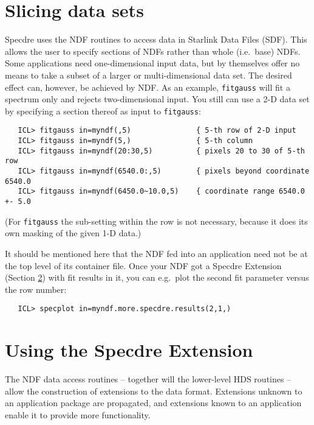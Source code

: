 \goodbreak
\section{Slicing data sets}
\label{slice}

Specdre uses the NDF routines to access data in Starlink Data Files (SDF).
This allows the user to specify sections of NDFs rather than whole (i.e.\ base)
NDFs. Some applications need one-dimensional input data, but by themselves
offer no means to take a subset of a larger or multi-dimensional data set. The
desired effect can, however, be achieved by NDF. As an example, {\tt fitgauss}
will fit a spectrum only and rejects two-dimensional input. You still can use a
2-D data set by specifying a section thereof as input to {\tt fitgauss}:

\begin{verbatim}
   ICL> fitgauss in=myndf(,5)               { 5-th row of 2-D input
   ICL> fitgauss in=myndf(5,)               { 5-th column
   ICL> fitgauss in=myndf(20:30,5)          { pixels 20 to 30 of 5-th row
   ICL> fitgauss in=myndf(6540.0:,5)        { pixels beyond coordinate 6540.0
   ICL> fitgauss in=myndf(6450.0~10.0,5)    { coordinate range 6540.0 +- 5.0
\end{verbatim}

(For {\tt fitgauss} the sub-setting within the row is not necessary, because it
does its own masking of the given 1-D data.)

It should be mentioned here that the NDF fed into an application need not be at
the top level of its container file. Once your NDF got a Specdre Extension
(Section \ref{useext}) with fit results in it, you can e.g.\ plot the second
fit parameter versus the row number:

\begin{verbatim}
   ICL> specplot in=myndf.more.specdre.results(2,1,)
\end{verbatim}


\goodbreak
\section{Using the Specdre Extension}
\label{useext}

The NDF data access routines -- together will the lower-level HDS routines --
allow the construction of extensions to the data format. Extensions unknown to
an application package are propagated, and extensions known to an application
enable it to provide more functionality.

